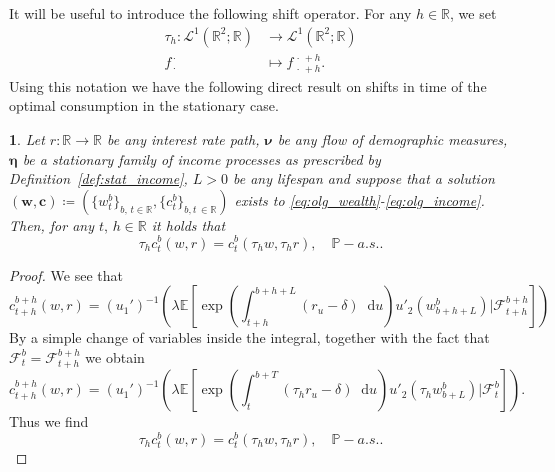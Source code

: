 \documentclass[11pt,oneside,english,reqno,dvipsnames,table]{amsart}
\numberwithin{equation}{section}
\theoremstyle{plain}
\theoremstyle{definition}
\theoremstyle{remark}
\newtheorem{rem}[thm]{\protect\remarkname}
\theoremstyle{plain}
\newtheorem{lem}[thm]{\protect\lemmaname}
\theoremstyle{plain}
\theoremstyle{plain}
\theoremstyle{plain}
\theoremstyle{plain}
\theoremstyle{plain}
\theoremstyle{plain}
\providecommand{\lemmaname}{Lemma}
\providecommand{\remarkname}{Remark}
\providecommand{\remarkname}{Remark}
\newcommand{\var}{\,\cdot\,}
\newcommand{\cF}{\mathcal{F}}
\newcommand{\EE}{\mathbb{E}}
\newcommand{\PP}{\mathbb{P}}
\newcommand{\bc}{\mathbf{c}}
\newcommand{\bw}{\mathbf{w}}
\newcommand{\dd}{\mathop{}\!\mathrm{d}}
\newcommand{\mbR}{\mathbb{R}}
\newcommand{\msL}{\mathscr{L}}
\newcommand{\bmeta}{\boldsymbol{\eta}}
\newcommand{\bnu}{\boldsymbol{\nu}}
\numberwithin{thm}{section}
\begin{document}
%
%
It will be useful to introduce the following shift operator. For any $h\in \mbR$, we set
%
\begin{align*}
	\tau_h :\msL^1(\mbR^2;\mbR) &\to\msL^1(\mbR^2;\mbR)\\
	f^{\var}_{\var} &\mapsto f^{\var+h}_{\var+h}.
\end{align*}
%
Using this notation we have the following direct result on shifts in time of the optimal consumption in the stationary case.
%
\begin{lem}\label{lem:consumption_time_shift}
  Let $r:\mbR\to \mbR$ be any interest rate path, $\bnu$ be any flow of demographic measures, $\bmeta$ be a stationary family of income processes as prescribed by Definition~\ref{def:stat_income}, $L>0$ be any lifespan and suppose that a solution $(\bw,\bc) \coloneqq (\{w^b_t\}_{b,\,t\in \mbR},\{c^b_t\}_{b,t\, \in \mbR})$ exists to \eqref{eq:olg_wealth}-\eqref{eq:olg_income}. Then, for any $t,\, h\in \mbR$ it holds that
    \begin{equation*}
    \tau_hc_{t}^b(w,r)=c_t^b(\tau_h w,\tau_h r), \quad \PP-a.s.. 
    \end{equation*}
   
\end{lem}

\begin{proof}
    We see that 
    \begin{equation*}
        c_{t+h}^{b+h}(w,r) = (u_1')^{-1}\left(\lambda \EE\left[\exp\left(\int_{t+h}^{b+h+L} (r_u-\delta)\dd u\right) u'_2(w_{b+h+L}^{b})|\cF_{t+h}^{b+h}\right]\right)
    \end{equation*}
    By a simple change of variables inside the integral, together with the fact that $\cF_t^b = \cF_{t+h}^{b+h}$ we obtain
    \begin{equation*}
        c_{t+h}^{b+h}(w,r) = (u_1')^{-1}\left(\lambda \EE\left[\exp\left(\int_{t}^{b+T} (\tau_hr_{u}-\delta)\dd u\right) u'_2(\tau_h w_{b+L}^{b})|\cF_{t}^b\right]\right). 
    \end{equation*}
    Thus we find 
    \begin{equation*}
\tau_hc_{t}^b(w,r)=c_t^b(\tau_h w,\tau_h r), \quad \PP-a.s.. 
    \end{equation*}
\end{proof}
\end{document}
